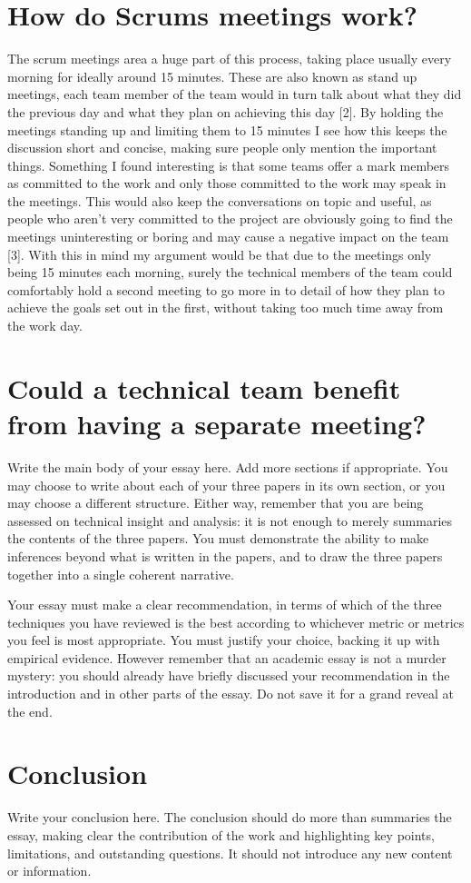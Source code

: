 \documentclass{scrartcl}
\begin{document}
\section{How do Scrums meetings work?}
The scrum meetings area a huge part of this process, taking place usually every morning for ideally around 15 minutes. These are also known as stand up meetings, each team member of the team would in turn talk about what they did the previous day and what they plan on achieving this day [2]. By holding the meetings standing up and limiting them to 15 minutes I see how this keeps the discussion short and concise, making sure people only mention the important things. Something I found interesting is that some teams offer a mark members as committed to the work and only those committed to the work may speak in the meetings. This would also keep the conversations on topic and useful, as people who aren't very committed to the project are obviously going to find the meetings uninteresting or boring and may cause a negative impact on the team [3].
With this in mind my argument would be that due to the meetings only being 15 minutes each morning, surely the technical members of the team could comfortably hold a second meeting to go more in to detail of how they plan to achieve the goals set out in the first, without taking too much time away from the work day. 

\section{Could a technical team benefit from having a separate meeting?}
Write the main body of your essay here. Add more sections if appropriate. You may choose to write about each of your three papers in its own section, or you may choose a different structure. Either way, remember that you are being assessed on technical insight and analysis: it is not enough to merely summaries the contents of the three papers. You must demonstrate the ability to make inferences beyond what is written in the papers, and to draw the three papers together into a single coherent narrative.

Your essay must make a clear recommendation, in terms of which of the three techniques you have reviewed is the best according to whichever metric or metrics you feel is most appropriate. You must justify your choice, backing it up with empirical evidence. However remember that an academic essay is not a murder mystery: you should already have briefly discussed your recommendation in the introduction and in other parts of the essay. Do not save it for a grand reveal at the end.

\section{Conclusion}

Write your conclusion here. The conclusion should do more than summaries the essay, making clear the contribution of the work and highlighting key points, limitations, and outstanding questions. It should not introduce any new content or information.



\end{document}
